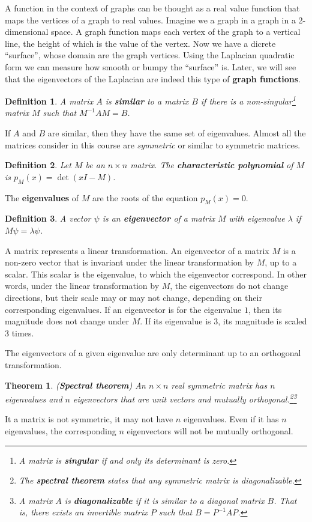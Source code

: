 \documentclass[]{article}
\newtheorem{theorem}{Theorem}[section]
\newtheorem{definition}{Definition}[section] %
\begin{document}
	A function in the context of graphs can be thought as a real value function that maps the vertices of a graph to real values. Imagine we a graph in a graph in a 2-dimensional space. A graph function maps each vertex of the graph to a vertical line, the height of which is the value of the vertex. Now we have a dicrete ``surface'', whose domain are the graph vertices. Using the Laplacian quadratic form we can measure how smooth or bumpy the ``surface'' is. Later, we will see that the eigenvectors of the Laplacian are indeed this type of \textbf{graph functions}.
	
	\begin{definition}
		A matrix $A$ is \textbf{similar} to a matrix $B$ if there is a non-singular\footnote{A matrix is \textbf{singular} if and only its determinant is zero.} matrix $M$ such that $M^{-1}AM=B$. 
	\end{definition}
	If $A$ and $B$ are similar, then they have the same set of eigenvalues. Almost all the matrices consider in this course are \textit{symmetric} or similar to symmetric matrices. 
	
	\begin{definition}
		Let $M$ be an $n\times n$ matrix. The \textbf{characteristic polynomial} of $M$ is $p_M(x)=\det (xI - M)$.
	\end{definition}
	The \textbf{eigenvalues} of $M$ are the roots of the equation $p_M(x)=0$.
	
	\begin{definition}
		A vector $\psi$ is an \textbf{eigenvector} of a matrix $M$ with eigenvalue $\lambda$ if $M\psi=\lambda \psi$.
	\end{definition}
	A matrix represents a linear transformation. An eigenvector of a matrix $M$ is a non-zero vector that is invariant under the linear transformation by $M$, up to a scalar. This scalar is the eigenvalue, to which the eigenvector correspond. In other words, under the linear transformation by $M$, the eigenvectors do not change directions, but their scale may or may not change, depending on their corresponding eigenvalues. If an eigenvector is for the eigenvalue $1$, then its magnitude does not change under $M$. If its eigenvalue is $3$, its magnitude is scaled 3 times. 
	
	The eigenvectors of a given eigenvalue are only determinant up to an orthogonal transformation. 
	
	\begin{theorem} (\textbf{Spectral theorem})
		An $n \times n$ real symmetric matrix has $n$ eigenvalues and $n$ eigenvectors that are unit vectors and mutually orthogonal.\footnote{The \textbf{spectral theorem} states that any symmetric matrix is diagonalizable.}\footnote{A matrix $A$ is \textbf{diagonalizable} if it is similar to a diagonal matrix $B$. That is, there exists an invertible matrix $P$ such that $B = P^{-1}AP$.}
	\end{theorem}
	It a matrix is not symmetric, it may not have $n$ eigenvalues. Even if it has $n$ eigenvalues, the corresponding $n$ eigenvectors will not be mutually orthogonal. 
	
\end{document}
